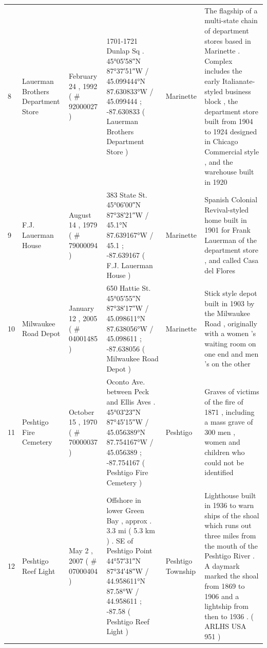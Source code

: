 \documentclass{article}
\begin{document}
\begin{tabular}{llllll}
8 & Lauerman Brothers Department Store & February 24 , 1992 ( \# 92000027 ) & 1701-1721 Dunlap Sq . 45°05′58″N 87°37′51″W / 45.099444°N 87.630833°W / 45.099444 ; -87.630833 ( Lauerman Brothers Department Store ) & Marinette & The flagship of a multi-state chain of department stores based in Marinette . Complex includes the early Italianate-styled business block , the department store built from 1904 to 1924 designed in Chicago Commercial style , and the warehouse built in 1920 \\
9 & F.J. Lauerman House & August 14 , 1979 ( \# 79000094 ) & 383 State St. 45°06′00″N 87°38′21″W / 45.1°N 87.639167°W / 45.1 ; -87.639167 ( F.J. Lauerman House ) & Marinette & Spanish Colonial Revival-styled home built in 1901 for Frank Lauerman of the department store , and called Casa del Flores \\
10 & Milwaukee Road Depot & January 12 , 2005 ( \# 04001485 ) & 650 Hattie St. 45°05′55″N 87°38′17″W / 45.098611°N 87.638056°W / 45.098611 ; -87.638056 ( Milwaukee Road Depot ) & Marinette & Stick style depot built in 1903 by the Milwaukee Road , originally with a women 's waiting room on one end and men 's on the other \\
11 & Peshtigo Fire Cemetery & October 15 , 1970 ( \# 70000037 ) & Oconto Ave. between Peck and Ellis Aves . 45°03′23″N 87°45′15″W / 45.056389°N 87.754167°W / 45.056389 ; -87.754167 ( Peshtigo Fire Cemetery ) & Peshtigo & Graves of victims of the fire of 1871 , including a mass grave of 300 men , women and children who could not be identified \\
12 & Peshtigo Reef Light & May 2 , 2007 ( \# 07000404 ) & Offshore in lower Green Bay , approx . 3.3 mi ( 5.3 km ) . SE of Peshtigo Point 44°57′31″N 87°34′48″W / 44.958611°N 87.58°W / 44.958611 ; -87.58 ( Peshtigo Reef Light ) & Peshtigo Township & Lighthouse built in 1936 to warn ships of the shoal which runs out three miles from the mouth of the Peshtigo River . A daymark marked the shoal from 1869 to 1906 and a lightship from then to 1936 . ( ARLHS USA 951 ) \\
\bottomrule
\end{tabular}
\end{document}
